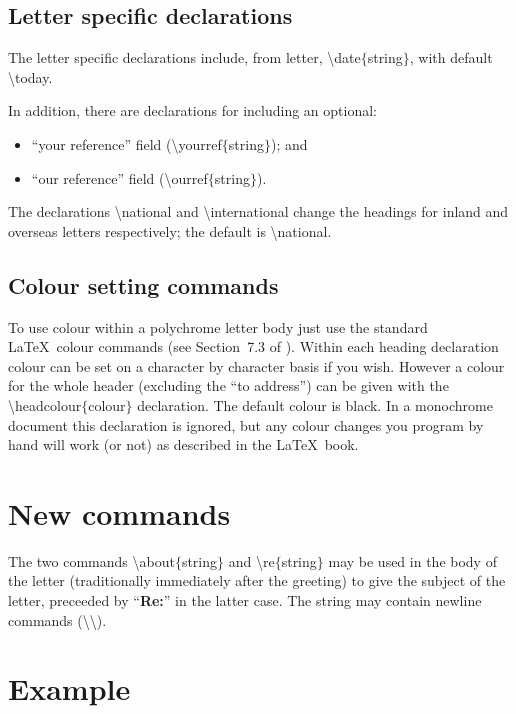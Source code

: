 \documentclass[12pt,a4paper]{article}
\newcommand{\cmdsty}[1]{\textsf{#1}}
\newcommand{\cmd}[1]{\cmdsty{\textbackslash#1}}
\newcommand{\pcmd}[2]{\cmdsty{\cmd{#1}$\{$#2$\}$}}
\newcommand{\nl}{\textbackslash\textbackslash}
\begin{document}
\subsection{Letter specific declarations}\label{LetDec:SS}

The letter specific declarations include, from \cmdsty{letter},
\pcmd{date}{string}, with default \cmd{today}.

In addition, there are declarations for including an optional:
\begin{itemize}
\item ``your reference'' field (\pcmd{yourref}{string}); and
\item ``our reference'' field (\pcmd{ourref}{string}). 
\end{itemize}

The declarations \cmd{national} and \cmd{international} change the
headings for inland and overseas letters respectively; the default is
\cmd{national}.

\subsection{Colour setting commands}\label{Colour:SS}

To use colour within a \cmdsty{polychrome} letter body just use the
standard \LaTeX\ colour commands (see Section~7.3 of
).  Within each heading declaration colour can
be set on a character by character basis if you wish.  However a
colour for the whole header (excluding the ``to address'') can be
given with the \pcmd{headcolour}{colour} declaration.  The default
colour is \cmdsty{black}.  In a \cmdsty{monochrome} document this
declaration is ignored, but any colour changes you program by hand
will work (or not) as described in the \LaTeX\ book.

\section{New commands}\label{NewCom:Sec}

The two commands \pcmd{about}{string} and \pcmd{re}{string} may be
used in the body of the letter (traditionally immediately after the
greeting) to give the subject of the letter, preceeded by
``\textbf{Re:}'' in the latter case.  The \cmdsty{string} may contain
newline commands (\nl).

\section{Example}
\end{document}
